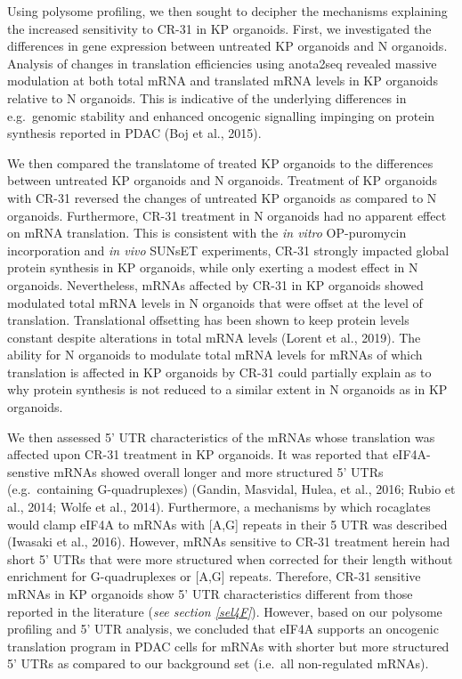 \documentclass[
  12pt,
  openany]{book}
\begin{document}
Using polysome profiling, we then sought to decipher the mechanisms explaining the increased sensitivity to CR-31 in KP organoids. First, we investigated the differences in gene expression between untreated KP organoids and N organoids. Analysis of changes in translation efficiencies using anota2seq revealed massive modulation at both total mRNA and translated mRNA levels in KP organoids relative to N organoids. This is indicative of the underlying differences in e.g.~genomic stability and enhanced oncogenic signalling impinging on protein synthesis reported in PDAC (Boj et al., 2015).

We then compared the translatome of treated KP organoids to the differences between untreated KP organoids and N organoids. Treatment of KP organoids with CR-31 reversed the changes of untreated KP organoids as compared to N organoids. Furthermore, CR-31 treatment in N organoids had no apparent effect on mRNA translation. This is consistent with the \emph{in vitro} OP-puromycin incorporation and \emph{in vivo} SUNsET experiments, CR-31 strongly impacted global protein synthesis in KP organoids, while only exerting a modest effect in N organoids. Nevertheless, mRNAs affected by CR-31 in KP organoids showed modulated total mRNA levels in N organoids that were offset at the level of translation. Translational offsetting has been shown to keep protein levels constant despite alterations in total mRNA levels (Lorent et al., 2019). The ability for N organoids to modulate total mRNA levels for mRNAs of which translation is affected in KP organoids by CR-31 could partially explain as to why protein synthesis is not reduced to a similar extent in N organoids as in KP organoids.

We then assessed 5' UTR characteristics of the mRNAs whose translation was affected upon CR-31 treatment in KP organoids. It was reported that eIF4A-senstive mRNAs showed overall longer and more structured 5' UTRs (e.g.~containing G-quadruplexes) (Gandin, Masvidal, Hulea, et al., 2016; Rubio et al., 2014; Wolfe et al., 2014). Furthermore, a mechanisms by which rocaglates would clamp eIF4A to mRNAs with {[}A,G{]} repeats in their 5 UTR was described (Iwasaki et al., 2016). However, mRNAs sensitive to CR-31 treatment herein had short 5' UTRs that were more structured when corrected for their length without enrichment for G-quadruplexes or {[}A,G{]} repeats. Therefore, CR-31 sensitive mRNAs in KP organoids show 5' UTR characteristics different from those reported in the literature (\emph{see section \ref{sel4F}}). However, based on our polysome profiling and 5' UTR analysis, we concluded that eIF4A supports an oncogenic translation program in PDAC cells for mRNAs with shorter but more structured 5' UTRs as compared to our background set (i.e.~all non-regulated mRNAs).
\end{document}

